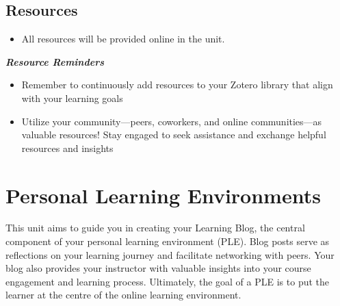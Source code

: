 \documentclass[
  letterpaper,
  DIV=11,
  numbers=noendperiod]{scrreprt}
\providecommand{\tightlist}{%
  \setlength{\itemsep}{0pt}\setlength{\parskip}{0pt}}\usepackage{longtable,booktabs,array}
\begin{document}
\subsection*{Resources}\label{resources-3}

\begin{itemize}
\tightlist
\item
  All resources will be provided online in the unit.
\end{itemize}

\begin{tcolorbox}[enhanced jigsaw, toprule=.15mm, colback=white, colframe=quarto-callout-note-color-frame, arc=.35mm, opacityback=0, breakable, rightrule=.15mm, bottomrule=.15mm, leftrule=.75mm, left=2mm]
\begin{minipage}[t]{5.5mm}
\textcolor{quarto-callout-note-color}{\faInfo}
\end{minipage}%
\begin{minipage}[t]{\textwidth - 5.5mm}

\textbf{\emph{Resource Reminders}}

\begin{itemize}
\tightlist
\item
  Remember to continuously add resources to your Zotero library that
  align with your learning goals
\item
  Utilize your community---peers, coworkers, and online communities---as
  valuable resources! Stay engaged to seek assistance and exchange
  helpful resources and insights
\end{itemize}

\end{minipage}%
\end{tcolorbox}

\section{Personal Learning
Environments}\label{personal-learning-environments}

This unit aims to guide you in creating your Learning Blog, the central
component of your personal learning environment (PLE). Blog posts serve
as reflections on your learning journey and facilitate networking with
peers. Your blog also provides your instructor with valuable insights
into your course engagement and learning process. Ultimately, the goal
of a PLE is to put the learner at the centre of the online learning
environment.
\end{document}
